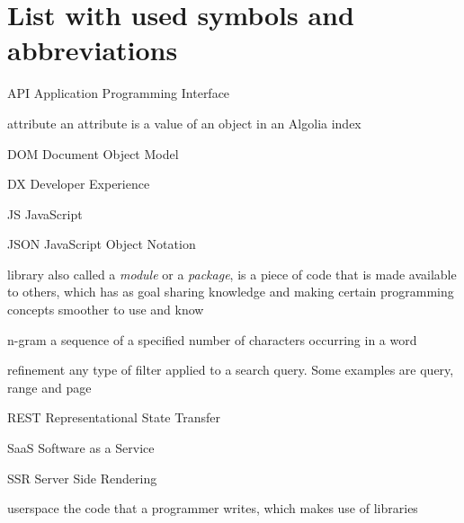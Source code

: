 
\chapter{List with used symbols and abbreviations}

\begin{abbreviations}
\item[API] Application Programming Interface
\item[attribute] an attribute is a value of an object in an Algolia index
\item[DOM] Document Object Model
\item[DX] Developer Experience
\item[JS] JavaScript
\item[JSON] JavaScript Object Notation
\item[library] also called a \emph{module} or a \emph{package}, is a piece of code that is made available to others, which has as goal sharing knowledge and making certain programming concepts smoother to use and know
\item[n-gram] a sequence of a specified number of characters occurring in a word\cite{kimbrell1988searching}
\item[refinement] any type of filter applied to a search query. Some examples are query, range and page
\item[REST] Representational State Transfer\cite{fielding2000architectural}
\item[SaaS] Software as a Service
\item[SSR] Server Side Rendering
\item[userspace] the code that a programmer writes, which makes use of libraries
\end{abbreviations}
